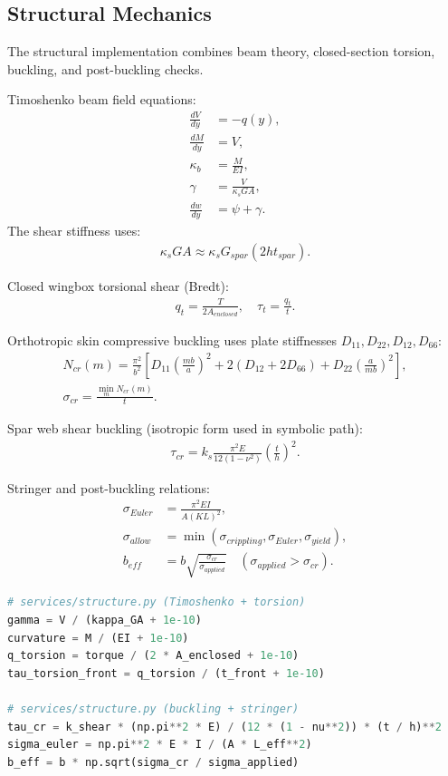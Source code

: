 ﻿\documentclass[11pt]{article}
\begin{document}
\subsection{Structural Mechanics}
The structural implementation combines beam theory, closed-section torsion, buckling, and post-buckling checks.

Timoshenko beam field equations:
\begin{align}
\frac{dV}{dy} &= -q(y), \\
\frac{dM}{dy} &= V, \\
\kappa_b &= \frac{M}{EI}, \\
\gamma &= \frac{V}{\kappa_s G A}, \\
\frac{dw}{dy} &= \psi + \gamma.
\end{align}
The shear stiffness uses:
\begin{align}
\kappa_s G A \approx \kappa_s G_{spar}\left(2 h t_{spar}\right).
\end{align}

Closed wingbox torsional shear (Bredt):
\begin{align}
q_t = \frac{T}{2A_{enclosed}}, \quad
\tau_t = \frac{q_t}{t}.
\end{align}

Orthotropic skin compressive buckling uses plate stiffnesses \(D_{11},D_{22},D_{12},D_{66}\):
\begin{align}
N_{cr}(m)=\frac{\pi^2}{b^2}\left[D_{11}\left(\frac{mb}{a}\right)^2 + 2(D_{12}+2D_{66}) + D_{22}\left(\frac{a}{mb}\right)^2\right], \\
\sigma_{cr}=\frac{\min_m N_{cr}(m)}{t}.
\end{align}

Spar web shear buckling (isotropic form used in symbolic path):
\begin{align}
\tau_{cr}=k_s\frac{\pi^2E}{12(1-\nu^2)}\left(\frac{t}{h}\right)^2.
\end{align}

Stringer and post-buckling relations:
\begin{align}
\sigma_{Euler} &= \frac{\pi^2 E I}{A (K L)^2}, \\
\sigma_{allow} &= \min(\sigma_{crippling}, \sigma_{Euler}, \sigma_{yield}), \\
b_{eff} &= b\sqrt{\frac{\sigma_{cr}}{\sigma_{applied}}}\quad(\sigma_{applied}>\sigma_{cr}).
\end{align}

\begin{lstlisting}[language=Python,caption={Key structural equations as implemented}]
# services/structure.py (Timoshenko + torsion)
gamma = V / (kappa_GA + 1e-10)
curvature = M / (EI + 1e-10)
q_torsion = torque / (2 * A_enclosed + 1e-10)
tau_torsion_front = q_torsion / (t_front + 1e-10)

# services/structure.py (buckling + stringer)
tau_cr = k_shear * (np.pi**2 * E) / (12 * (1 - nu**2)) * (t / h)**2
sigma_euler = np.pi**2 * E * I / (A * L_eff**2)
b_eff = b * np.sqrt(sigma_cr / sigma_applied)
\end{lstlisting}
\end{document}
